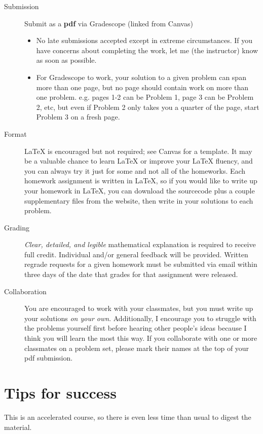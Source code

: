 \documentclass{article}
\begin{document}
\begin{description}
    \item[{Submission}] Submit as a \textbf{pdf} via Gradescope (linked from Canvas)
    \begin{itemize}
        \item No late submissions accepted except in extreme circumstances. If you have concerns about completing the work, let me (the instructor) know as soon as possible.
        \item For Gradescope to work, your solution to a given problem can span more than one page, but no page should contain work on more than one problem. e.g. pages 1-2 can be Problem 1, page 3 can be Problem 2, etc, but even if Problem 2 only takes you a quarter of the page, start Problem 3 on a fresh page.
    \end{itemize}
    \item[{Format}] LaTeX is encouraged but not required; see Canvas for a template. It may be a valuable chance to learn LaTeX or improve your LaTeX fluency, and you can always try it just for some and not all of the homeworks. Each homework assignment is written in LaTeX, so if you would like to write up your homework in LaTeX, you can download the sourcecode plus a couple supplementary files from the website, then write in your solutions to each problem.
    \item[{Grading}] \emph{Clear, detailed, and legible} mathematical explanation
    is required to receive full credit. Individual and/or general feedback will be provided. Written regrade requests for a given homework must be submitted via email within three days of the date that grades for that assignment were released.
    \item[{Collaboration}] You are encouraged to work with your classmates, but you must write up your solutions \emph{on your own}. Additionally, I encourage you to struggle with the problems yourself first before hearing other people's ideas because I think you will learn the most this way. If you collaborate with one or more classmates on a problem set, please mark their names at the top of your pdf submission.
\end{description}


\section{Tips for success}

This is an accelerated course, so there is even less time than usual to digest the material.
\end{document}

